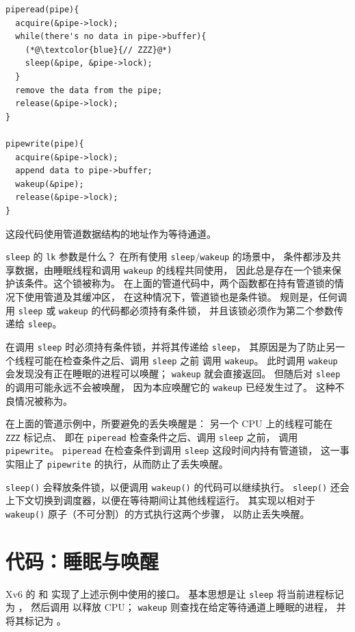 \begin{lstlisting}
piperead(pipe){
  acquire(&pipe->lock);
  while(there's no data in pipe->buffer){
    (*@\textcolor{blue}{// ZZZ}@*)
    sleep(&pipe, &pipe->lock);
  }
  remove the data from the pipe;
  release(&pipe->lock);
}

pipewrite(pipe){
  acquire(&pipe->lock);
  append data to pipe->buffer;
  wakeup(&pipe);
  release(&pipe->lock);
}
\end{lstlisting}

这段代码使用管道数据结构的地址作为等待通道。

\lstinline{sleep} 的 \lstinline{lk} 参数是什么？
在所有使用 \lstinline{sleep}/\lstinline{wakeup} 的场景中，
条件都涉及共享数据，由睡眠线程和调用 \lstinline{wakeup} 的线程共同使用，
因此总是存在一个锁来保护该条件。这个锁被称为。
在上面的管道代码中，两个函数都在持有管道锁的情况下使用管道及其缓冲区，
在这种情况下，管道锁也是条件锁。
规则是，任何调用 \lstinline{sleep} 或 \lstinline{wakeup} 的代码都必须持有条件锁，
并且该锁必须作为第二个参数传递给 \lstinline{sleep}。

在调用 \lstinline{sleep} 时必须持有条件锁，并将其传递给 \lstinline{sleep}，
其原因是为了防止另一个线程可能在检查条件之后、调用 \lstinline{sleep} 之前
调用 \lstinline{wakeup}。
此时调用 \lstinline{wakeup} 会发现没有正在睡眠的进程可以唤醒；
\lstinline{wakeup} 就会直接返回。
但随后对 \lstinline{sleep} 的调用可能永远不会被唤醒，
因为本应唤醒它的 \lstinline{wakeup} 已经发生过了。
这种不良情况被称为。

在上面的管道示例中，所要避免的丢失唤醒是：
另一个 CPU 上的线程可能在 {\tt ZZZ} 标记点、
即在 \lstinline{piperead} 检查条件之后、调用 \lstinline{sleep} 之前，
调用 \lstinline{pipewrite}。
\lstinline{piperead} 在检查条件到调用 \lstinline{sleep} 这段时间内持有管道锁，
这一事实阻止了 \lstinline{pipewrite} 的执行，从而防止了丢失唤醒。

{\tt sleep()} 会释放条件锁，以便调用 {\tt wakeup()} 的代码可以继续执行。
{\tt sleep()} 还会上下文切换到调度器，以便在等待期间让其他线程运行。
其实现以相对于 {\tt wakeup()} 原子（不可分割）的方式执行这两个步骤，
以防止丢失唤醒。

\section{代码：睡眠与唤醒}

Xv6 的
和
实现了上述示例中使用的接口。
基本思想是让
\lstinline{sleep}
将当前进程标记为
，
然后调用
以释放 CPU；
\lstinline{wakeup}
则查找在给定等待通道上睡眠的进程，
并将其标记为
。


